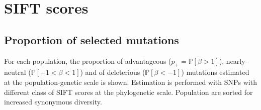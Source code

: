 \documentclass{article}
\newcommand{\proba}{\mathbb{P}}
\newcommand{\Spop}{\beta}
\newcommand{\polyDel}{\Spop < -1}
\newcommand{\polyNeutral}{-1 < \Spop < 1}
\newcommand{\polyAdv}{ \Spop > 1}
\newcommand{\PpolyDel}{\proba \left[ \polyDel \right]}
\newcommand{\PpolyNeutral}{\proba \left[ \polyNeutral \right]}
\newcommand{\PpolyAdv}{\proba \left[ \polyAdv \right]}
\begin{document}
    

    \newpage
    \section{SIFT scores}\label{sec:sift-scores}

    \subsection{Proportion of selected mutations}\label{subsec:proportion-of-selected-mutations}
    For each population, the proportion of advantageous ($p_+=\PpolyAdv$), nearly-neutral ($\PpolyNeutral$) and of deleterious ($\PpolyDel$) mutations estimated at the population-genetic scale is shown.
    Estimation is performed with SNPs with different class of SIFT scores at the phylogenetic scale.
    Population are sorted for increased synonymous diversity.
\end{document}

